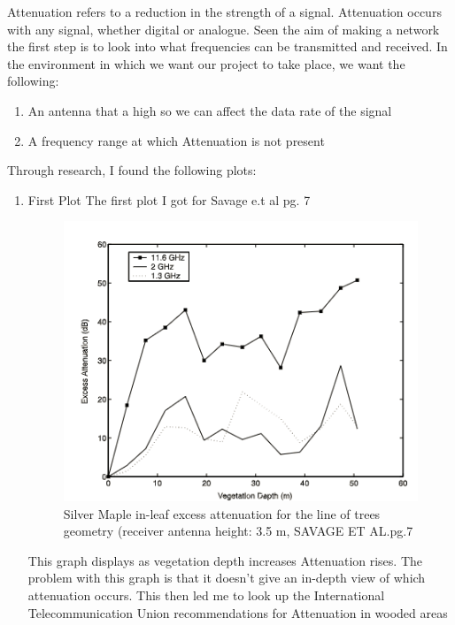 
Attenuation refers to a reduction in the strength of a signal.
 Attenuation occurs with any signal, whether digital or analogue. 
Seen the aim of making a network the first step is to look into  
what frequencies can be transmitted and received.
\newline
In the environment in which we want our project to take place, we want the following:
 \begin{enumerate}
	\item An antenna that a high so we can affect the data rate of the signal
	\item A frequency range at which Attenuation is not present 
 \end{enumerate}
Through research, I found the following plots:

\newpage

\begin{enumerate}

	\item  First Plot
	The first plot  I got for Savage e.t al pg. 7 \cite{Savage}
	\begin{figure}[h!]
		\centering
		\includegraphics[width=0.5\linewidth]{Images/Silver_Maple.png}
		\caption{Silver Maple in-leaf excess attenuation for the line of trees geometry (receiver antenna height: 3.5 m, SAVAGE ET AL.pg.7}
		\label{Silver Maple in-leaf excess attenuation for the line of trees geometry (receiver antenna height: 3.5 m, SAVAGE ET AL.pg.7}
	\end{figure}
 
This graph displays as vegetation depth increases  Attenuation rises. The problem with this graph is that it doesn't give an in-depth view of which attenuation occurs.
This then led me to look up the International Telecommunication Union  \cite{ITU} recommendations for Attenuation in wooded areas




\end{enumerate}
